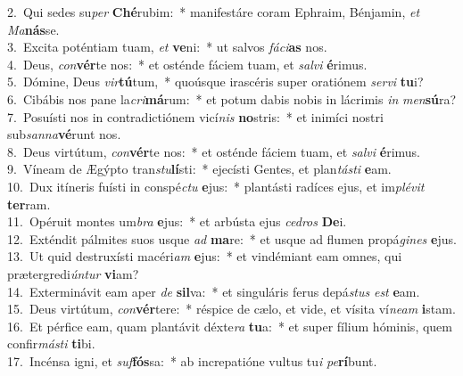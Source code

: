 {2.~}Qui sedes su\textit{per} \textbf{Ché}rubim:~* manifestáre coram Ephraim, Bénjamin, \textit{et} \textit{Ma}\textbf{nás}se.\\
{3.~}Excita poténtiam tuam, \textit{et} \textbf{ve}ni:~* ut salvos \textit{fá}\textit{ci}\textbf{as} nos.\\
{4.~}Deus, \textit{con}\textbf{vér}te nos:~* et osténde fáciem tuam, et \textit{sal}\textit{vi} \textbf{é}rimus.\\
{5.~}Dómine, Deus \textit{vir}\textbf{tú}tum,~* quoúsque irascéris super oratiónem \textit{ser}\textit{vi} \textbf{tu}i?\\
{6.~}Cibábis nos pane la\textit{cri}\textbf{má}rum:~* et potum dabis nobis in lácrimis \textit{in} \textit{men}\textbf{sú}ra?\\
{7.~}Posuísti nos in contradictiónem vicí\textit{nis} \textbf{no}stris:~* et inimíci nostri sub\textit{san}\textit{na}\textbf{vé}runt nos.\\
{8.~}Deus virtútum, \textit{con}\textbf{vér}te nos:~* et osténde fáciem tuam, et \textit{sal}\textit{vi} \textbf{é}rimus.\\
{9.~}Víneam de Ægýpto tran\textit{stu}\textbf{lí}sti:~* ejecísti Gentes, et plan\textit{tá}\textit{sti} \textbf{e}am.\\
{10.~}Dux itíneris fuísti in conspé\textit{ctu} \textbf{e}jus:~* plantásti radíces ejus, et im\textit{plé}\textit{vit} \textbf{ter}ram.\\
{11.~}Opéruit montes um\textit{bra} \textbf{e}jus:~* et arbústa ejus \textit{ce}\textit{dros} \textbf{De}i.\\
{12.~}Exténdit pálmites suos usque \textit{ad} \textbf{ma}re:~* et usque ad flumen propá\textit{gi}\textit{nes} \textbf{e}jus.\\
{13.~}Ut quid destruxísti macéri\textit{am} \textbf{e}jus:~* et vindémiant eam omnes, qui prætergredi\textit{ún}\textit{tur} \textbf{vi}am?\\
{14.~}Exterminávit eam aper \textit{de} \textbf{sil}va:~* et singuláris ferus depá\textit{stus} \textit{est} \textbf{e}am.\\
{15.~}Deus virtútum, \textit{con}\textbf{vér}tere:~* réspice de cælo, et vide, et vísita ví\textit{ne}\textit{am} \textbf{i}stam.\\
{16.~}Et pérfice eam, quam plantávit déxte\textit{ra} \textbf{tu}a:~* et super fílium hóminis, quem confir\textit{má}\textit{sti} \textbf{ti}bi.\\
{17.~}Incénsa igni, et \textit{suf}\textbf{fós}sa:~* ab increpatióne vultus tu\textit{i} \textit{pe}\textbf{rí}bunt.\\
